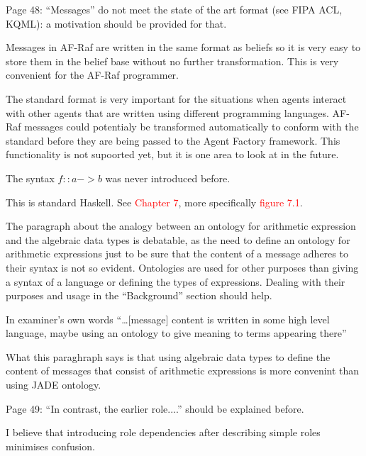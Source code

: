 \documentclass{article}
\newcommand*\R[1]{\textcolor{red}{#1}} %
\newenvironment{them}{\noindent\begingroup\color{blue}}{\endgroup\par}
\begin{document}
\begin{them}

Page 48:
“Messages” do not meet the state of the art format (see FIPA ACL, KQML): a
motivation should be provided for that.

\end{them}

Messages in AF-Raf are written in the same format as beliefs so it is very easy
to store them in the belief base without no further transformation. This is
very convenient for the AF-Raf programmer. 

The standard format is very important for the situations when agents interact
with other agents that are written using different programming languages.
AF-Raf messages could potentialy be transformed automatically to conform with
the standard before they are being passed to the Agent Factory framework. This
functionality is not supoorted yet, but it is one area to look at in the
future.

\begin{them}

The syntax $f::a->b$ was never introduced before.
\end{them}
This is standard Haskell. See \R{Chapter 7}, more specifically \R{figure 7.1}.

\begin{them}

The paragraph about the analogy between an ontology for arithmetic expression
and the algebraic data types is debatable, as the need to define an ontology
for arithmetic expressions just to be sure that the content of a message
adheres to their syntax is not so evident. Ontologies are used for other
purposes than giving a syntax of a language or defining the types of
expressions. Dealing with their purposes and usage in the “Background” section
should help.

\end{them}
In examiner's own words ``\ldots [message] content is written in some high
level language, maybe using an ontology to give meaning to terms appearing
there''

What this paraghraph says is that using algebraic data types to define the
content of messages that consist of arithmetic expressions is more convenint
than using JADE ontology.

\begin{them}

Page 49:
“In contrast, the earlier role....” should be explained before.
\end{them}
I believe that introducing role dependencies after describing simple roles
minimises confusion.
\end{document}
